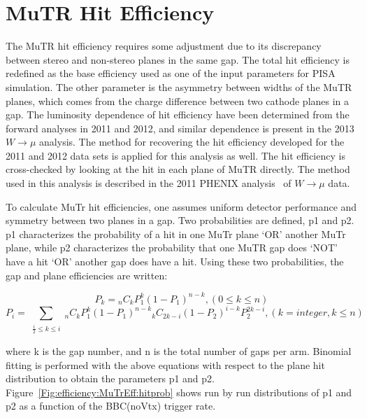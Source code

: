 \section{MuTR Hit Efficiency}
The MuTR hit efficiency requires some adjustment due to its discrepancy between
stereo and non-stereo planes in the same gap. The total hit efficiency is
redefined as the base efficiency used as one of the input parameters for PISA
simulation. The other parameter is the asymmetry between widths of the MuTR
planes, which comes from the charge difference between two cathode planes in a
gap.  The luminosity dependence of hit efficiency have been determined from the
forward analyses in 2011 and 2012, and similar dependence is present in the 2013
$W\rightarrow\mu$ analysis. The method for recovering the hit efficiency
developed for the 2011 and 2012 data sets is applied for this analysis as well.
The hit efficiency is cross-checked by looking at the hit in each plane of MuTR
directly. The method used in this analysis is described in the 2011 PHENIX
analysis~\cite{Seidl2012} of $W\rightarrow\mu$ data.

To calculate MuTr hit efficiencies, one assumes uniform detector performance and
symmetry between two planes in a gap. Two probabilities are defined, p1 and p2.
p1 characterizes the probability of a hit in one MuTr plane `OR' another MuTr
plane, while p2 characterizes the probability that one MuTR gap does `NOT' have
a hit `OR' another gap does have a hit. Using these two probabilities, the gap
and plane efficiencies are written:

\begin{equation}
P_{k}={_n}C_{k}P_{1}^{k}(1-P_{1})^{n-k}, (0\leq k\leq n)
\end{equation}
\begin{equation}
P_{i}=\sum_{\substack{\frac{i}{2}\leq k\leq i}}{_n}C_{k}P_{1}^{k}(1-P_{1})^{n-k}{_k}C_{2k-i}(1-P_{2})^{i-k}P_{2}^{2k-i}, (k=integer, k\leq n)
\end{equation}

{\noindent}where k is the gap number, and n is the total number of gaps per arm.
Binomial fitting is performed with the above equations with respect to the plane
hit distribution to obtain the parameters p1 and p2.
Figure~\ref{Fig:efficiency:MuTrEff:hitprob} shows run by run distributions of p1
and p2 as a function of the BBC(noVtx) trigger rate.

